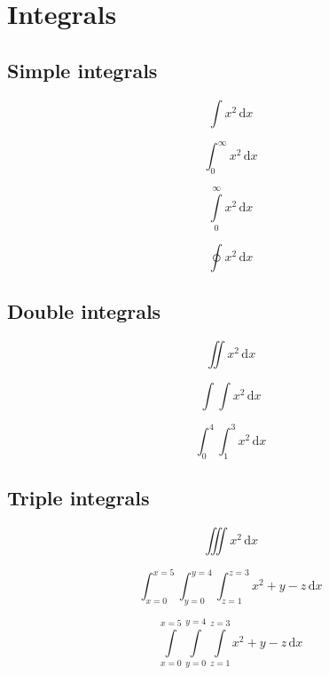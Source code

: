 \documentclass{article}
\newcommand*{\dd}[1][x]{\,\mathrm{d}#1}
\begin{document}
\section*{Integrals}

\subsection*{Simple integrals}

\[\int x^2 \dd\]

\[\int_{0}^{\infty} x^2 \dd\]

\[\int\limits_{0}^{\infty} x^2 \dd\]

\[\oint x^2 \dd\]

\subsection*{Double integrals}

\[\iint x^2 \dd \]

\[\int\int x^2 \dd\]

\[\int_{0}^{4}\int_{1}^{3} x^2 \dd\]

\subsection*{Triple integrals}

\[\iiint x^2 \dd\]

\[\int_{x=0}^{x=5}\int_{y=0}^{y=4}\int_{z=1}^{z=3} x^2+y-z \dd\]

\[\int\limits_{x=0}^{x=5}\int\limits_{y=0}^{y=4}\int\limits_{z=1}^{z=3} x^2+y-z \dd\]
\end{document}
